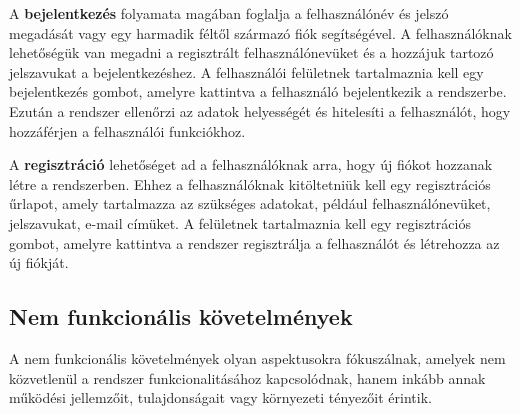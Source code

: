 \begin{itemize}
A \textbf{bejelentkezés} folyamata magában foglalja a felhasználónév és jelszó megadását vagy egy harmadik féltől származó fiók segítségével. A felhasználóknak lehetőségük van megadni a regisztrált felhasználónevüket és a hozzájuk tartozó jelszavukat a bejelentkezéshez. A felhasználói felületnek tartalmaznia kell egy bejelentkezés gombot, amelyre kattintva a felhasználó bejelentkezik a rendszerbe. Ezután a rendszer ellenőrzi az adatok helyességét és hitelesíti a felhasználót, hogy hozzáférjen a felhasználói funkciókhoz.

A \textbf{regisztráció} lehetőséget ad a felhasználóknak arra, hogy új fiókot hozzanak létre a rendszerben. Ehhez a felhasználóknak kitöltetniük kell egy regisztrációs űrlapot, amely tartalmazza az szükséges adatokat, például felhasználónevüket, jelszavukat, e-mail címüket. A felületnek tartalmaznia kell egy regisztrációs gombot, amelyre kattintva a rendszer regisztrálja a felhasználót és létrehozza az új fiókját.
\end{itemize}

\subsection {Nem funkcionális követelmények}

A nem funkcionális követelmények olyan aspektusokra fókuszálnak, amelyek nem közvetlenül a rendszer funkcionalitásához kapcsolódnak, hanem inkább annak működési jellemzőit, tulajdonságait vagy környezeti tényezőit érintik.

